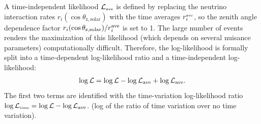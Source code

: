 \documentclass[aps,prd,reprint,superscriptaddress,floatfix,altaffilletter,nofootinbib]{revtex4-2}
\begin{document}
 A time-independent likelihood $\mathcal{L}_{\mbox{\tiny ave}}$ is defined by replacing the neutrino interaction rates $r_i(\cos \theta_{\mathrm{z,solar}})$ with the time averages $r_{i}^{\mbox{\tiny ave}}$, so
the zenith angle dependence factor $r_i(\cos \theta_{\mathrm{z,solar}})/r_i^\mathrm{\tiny ave}$ is set to 1. The large number of events renders the maximization of this likelihood (which depends on several nuisance parameters) computationally difficult. Therefore, the log-likelihood is formally split into a time-dependent log-likelihood ratio and a time-independent log-likelihood:
\begin{equation}
   \log \mathcal{L}= \log \mathcal{L}- \log \mathcal{L}_{\rm{\tiny ave}}+ \log \mathcal{L}_{\rm{\tiny ave}}.
\end{equation}
The first two terms are identified with the time-variation log-likelihood ratio
$\log \mathcal{L}_{\mbox{\tiny time}}=\log \mathcal{L}- \log \mathcal{L}_{\rm{\tiny ave}}$.
(log of the ratio of time variation over no time variation).
 
\end{document}
